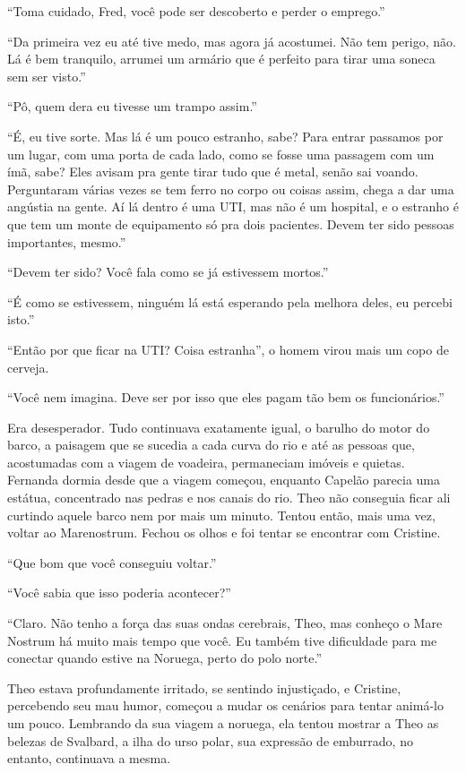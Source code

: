 ``Toma cuidado, Fred, você pode ser descoberto e perder o emprego.''

``Da primeira vez eu até tive medo, mas agora já acostumei. Não tem
perigo, não. Lá é bem tranquilo, arrumei um armário que é perfeito para
tirar uma soneca sem ser visto.''

``Pô, quem dera eu tivesse um trampo assim.''

``É, eu tive sorte. Mas lá é um pouco estranho, sabe? Para entrar
passamos por um lugar, com uma porta de cada lado, como se fosse uma
passagem com um ímã, sabe? Eles avisam pra gente tirar tudo que é metal,
senão sai voando. Perguntaram várias vezes se tem ferro no corpo ou
coisas assim, chega a dar uma angústia na gente. Aí lá dentro é uma UTI,
mas não é um hospital, e o estranho é que tem um monte de equipamento só
pra dois pacientes. Devem ter sido pessoas importantes, mesmo.''

``Devem ter sido? Você fala como se já estivessem mortos.''

``É como se estivessem, ninguém lá está esperando pela melhora deles, eu
percebi isto.''

``Então por que ficar na UTI? Coisa estranha'', o homem virou mais um
copo de cerveja.

``Você nem imagina. Deve ser por isso que eles pagam tão bem os
funcionários.''

\asterisc

Era desesperador. Tudo continuava exatamente igual, o barulho do motor
do barco, a paisagem que se sucedia a cada curva do rio e até as pessoas
que, acostumadas com a viagem de voadeira, permaneciam imóveis e
quietas. Fernanda dormia desde que a viagem começou, enquanto Capelão
parecia uma estátua, concentrado nas pedras e nos canais do rio. Theo
não conseguia ficar ali curtindo aquele barco nem por mais um minuto.
Tentou então, mais uma vez, voltar ao Marenostrum. Fechou os olhos e foi
tentar se encontrar com Cristine.

``Que bom que você conseguiu voltar.''

``Você sabia que isso poderia acontecer?''

``Claro. Não tenho a força das suas ondas cerebrais, Theo, mas conheço o
Mare Nostrum há muito mais tempo que você. Eu também tive dificuldade
para me conectar quando estive na Noruega, perto do polo norte.''

Theo estava profundamente irritado, se sentindo injustiçado, e Cristine,
percebendo seu mau humor, começou a mudar os cenários para tentar
animá-lo um pouco. Lembrando da sua viagem a noruega, ela tentou mostrar
a Theo as belezas de Svalbard, a ilha do urso polar, sua expressão de
emburrado, no entanto, continuava a mesma.

